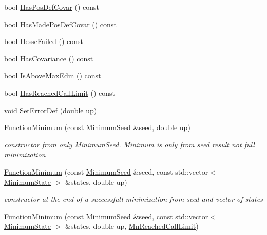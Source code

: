 \begin{DoxyCompactItemize}
bool \mbox{\hyperlink{classROOT_1_1Minuit2_1_1FunctionMinimum_acb9f7255fdd8afdb460bfe13e6d119c4}{Has\+Pos\+Def\+Covar}} () const
\item 
bool \mbox{\hyperlink{classROOT_1_1Minuit2_1_1FunctionMinimum_a7c0f417444609960c3b55bc869bf04d8}{Has\+Made\+Pos\+Def\+Covar}} () const
\item 
bool \mbox{\hyperlink{classROOT_1_1Minuit2_1_1FunctionMinimum_a6400b299323d7e632692229ce026056c}{Hesse\+Failed}} () const
\item 
bool \mbox{\hyperlink{classROOT_1_1Minuit2_1_1FunctionMinimum_ae11c13bd945f21476482d928bf96b791}{Has\+Covariance}} () const
\item 
bool \mbox{\hyperlink{classROOT_1_1Minuit2_1_1FunctionMinimum_aa87b9f0f50a77d219976b8767e39ac0f}{Is\+Above\+Max\+Edm}} () const
\item 
bool \mbox{\hyperlink{classROOT_1_1Minuit2_1_1FunctionMinimum_a524af3e3da7a975e7a104845c6a41ceb}{Has\+Reached\+Call\+Limit}} () const
\item 
void \mbox{\hyperlink{classROOT_1_1Minuit2_1_1FunctionMinimum_af45892d274c493850fc78e9917f17781}{Set\+Error\+Def}} (double up)
\item 
\mbox{\hyperlink{classROOT_1_1Minuit2_1_1FunctionMinimum_a907871106f0be755404d80f32fbe2041}{Function\+Minimum}} (const \mbox{\hyperlink{classROOT_1_1Minuit2_1_1MinimumSeed}{Minimum\+Seed}} \&seed, double up)
\begin{DoxyCompactList}\small\item\em constructor from only \mbox{\hyperlink{classROOT_1_1Minuit2_1_1MinimumSeed}{Minimum\+Seed}}. Minimum is only from seed result not full minimization \end{DoxyCompactList}\item 
\mbox{\hyperlink{classROOT_1_1Minuit2_1_1FunctionMinimum_a0d5de11a4f528f8c0a0d061dbcf3e91e}{Function\+Minimum}} (const \mbox{\hyperlink{classROOT_1_1Minuit2_1_1MinimumSeed}{Minimum\+Seed}} \&seed, const std\+::vector$<$ \mbox{\hyperlink{classROOT_1_1Minuit2_1_1MinimumState}{Minimum\+State}} $>$ \&states, double up)
\begin{DoxyCompactList}\small\item\em constructor at the end of a successfull minimization from seed and vector of states \end{DoxyCompactList}\item 
\mbox{\hyperlink{classROOT_1_1Minuit2_1_1FunctionMinimum_aa68c6d1a70d47537fef4990cd797ebc0}{Function\+Minimum}} (const \mbox{\hyperlink{classROOT_1_1Minuit2_1_1MinimumSeed}{Minimum\+Seed}} \&seed, const std\+::vector$<$ \mbox{\hyperlink{classROOT_1_1Minuit2_1_1MinimumState}{Minimum\+State}} $>$ \&states, double up, \mbox{\hyperlink{classROOT_1_1Minuit2_1_1FunctionMinimum_1_1MnReachedCallLimit}{Mn\+Reached\+Call\+Limit}})

\end{DoxyCompactItemize}
